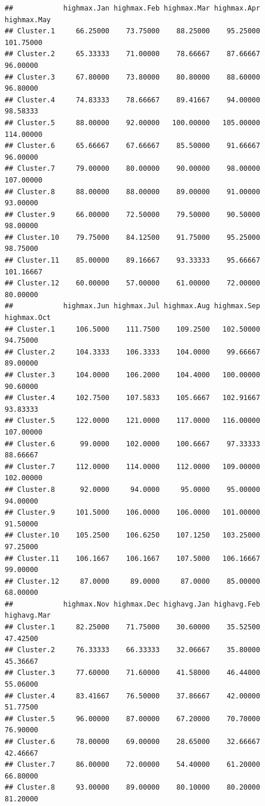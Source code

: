 \documentclass[
]{article}
\begin{document}
\begin{verbatim}
##            highmax.Jan highmax.Feb highmax.Mar highmax.Apr highmax.May
## Cluster.1     66.25000    73.75000    88.25000    95.25000   101.75000
## Cluster.2     65.33333    71.00000    78.66667    87.66667    96.00000
## Cluster.3     67.80000    73.80000    80.80000    88.60000    96.80000
## Cluster.4     74.83333    78.66667    89.41667    94.00000    98.58333
## Cluster.5     88.00000    92.00000   100.00000   105.00000   114.00000
## Cluster.6     65.66667    67.66667    85.50000    91.66667    96.00000
## Cluster.7     79.00000    80.00000    90.00000    98.00000   107.00000
## Cluster.8     88.00000    88.00000    89.00000    91.00000    93.00000
## Cluster.9     66.00000    72.50000    79.50000    90.50000    98.00000
## Cluster.10    79.75000    84.12500    91.75000    95.25000    98.75000
## Cluster.11    85.00000    89.16667    93.33333    95.66667   101.16667
## Cluster.12    60.00000    57.00000    61.00000    72.00000    80.00000
##            highmax.Jun highmax.Jul highmax.Aug highmax.Sep highmax.Oct
## Cluster.1     106.5000    111.7500    109.2500   102.50000    94.75000
## Cluster.2     104.3333    106.3333    104.0000    99.66667    89.00000
## Cluster.3     104.0000    106.2000    104.4000   100.00000    90.60000
## Cluster.4     102.7500    107.5833    105.6667   102.91667    93.83333
## Cluster.5     122.0000    121.0000    117.0000   116.00000   107.00000
## Cluster.6      99.0000    102.0000    100.6667    97.33333    88.66667
## Cluster.7     112.0000    114.0000    112.0000   109.00000   102.00000
## Cluster.8      92.0000     94.0000     95.0000    95.00000    94.00000
## Cluster.9     101.5000    106.0000    106.0000   101.00000    91.50000
## Cluster.10    105.2500    106.6250    107.1250   103.25000    97.25000
## Cluster.11    106.1667    106.1667    107.5000   106.16667    99.00000
## Cluster.12     87.0000     89.0000     87.0000    85.00000    68.00000
##            highmax.Nov highmax.Dec highavg.Jan highavg.Feb highavg.Mar
## Cluster.1     82.25000    71.75000    30.60000    35.52500    47.42500
## Cluster.2     76.33333    66.33333    32.06667    35.80000    45.36667
## Cluster.3     77.60000    71.60000    41.58000    46.44000    55.06000
## Cluster.4     83.41667    76.50000    37.86667    42.00000    51.77500
## Cluster.5     96.00000    87.00000    67.20000    70.70000    76.90000
## Cluster.6     78.00000    69.00000    28.65000    32.66667    42.46667
## Cluster.7     86.00000    72.00000    54.40000    61.20000    66.80000
## Cluster.8     93.00000    89.00000    80.10000    80.20000    81.20000

\end{verbatim}
\end{document}
